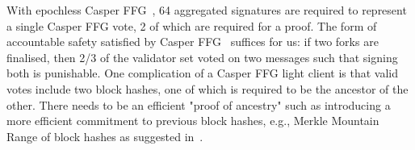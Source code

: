 With epochless Casper FFG~\cite{Gasper}, 64 aggregated signatures are required to represent a single Casper FFG vote, 2 of which are required for a proof. The form of accountable safety 
satisfied by Casper FFG~\cite{CasperFFG} suffices for us: if two forks are finalised, then 2/3 of the validator set voted on two messages such that signing both is punishable. One complication 
of a Casper FFG light client is that valid votes include two block hashes, one of which is required to be the ancestor of the other. There needs to be an efficient "proof of ancestry" such as introducing 
a more efficient commitment to previous block hashes, e.g., Merkle Mountain Range of block hashes as suggested in~\cite{flyclient}.
